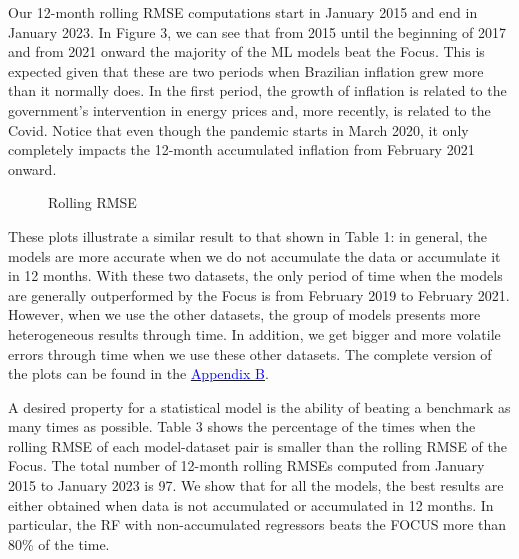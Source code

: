 \documentclass[12pt,openright,twoside,a4paper,brazil,english,emptypage,openany]{abntex2}
\begin{document}
Our 12-month rolling RMSE computations start in January 2015 and end in January 2023. In Figure 3, we can see that from 2015 until the beginning of 2017 and from 2021 onward the majority of the ML models beat the Focus. This is expected given that these are two periods when Brazilian inflation grew more than it normally does. In the first period, the growth of inflation is related to the government's intervention in energy prices and, more recently, is related to the Covid. Notice that even though the pandemic starts in March 2020, it only completely impacts the 12-month accumulated inflation from February 2021 onward. 


\begin{figure}[htbp]
    \centering
    \caption{Rolling RMSE}
    \label{fig:error}
\end{figure}

These plots illustrate a similar result to that shown in Table 1: in general, the models are more accurate when we do not accumulate the data or accumulate it in 12 months. With these two datasets, the only period of time when the models are generally outperformed by the Focus is from February 2019 to February 2021. However, when we use the other datasets, the group of models presents more heterogeneous results through time. In addition, we get bigger and more volatile errors through time when we use these other datasets. The complete version of the plots can be found in the \hyperref[sec:appendix.error.rolling]{\textcolor{blue}{Appendix B}}. 

A desired property for a statistical model is the ability of beating a benchmark as many times as possible. Table 3 shows the percentage of the times when the rolling RMSE of each model-dataset pair is smaller than the rolling RMSE of the Focus. The total number of 12-month rolling RMSEs computed from January 2015 to January 2023 is 97. We show that for 
all the models, the best results are either obtained when data is not accumulated or accumulated in 12 months. In particular, the RF with non-accumulated regressors beats the FOCUS more than 80\% of the time.
\end{document}
